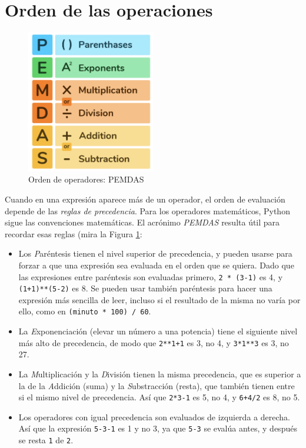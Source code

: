 \hypertarget{orden-de-las-operaciones}{%
\section{Orden de las operaciones}\label{orden-de-las-operaciones}}

 

\begin{figure}[t]
    \centering
    \includegraphics[width=0.5\textwidth]{book/Spanish/02_Valores_Variables_Tipos_etc/images/pemdas.png}
    \caption{Orden de operadores: PEMDAS}
    \label{fig:PEMDAS}
\end{figure}


Cuando en una expresión aparece más de un operador, el orden de
evaluación depende de las \emph{reglas de precedencia}. Para los
operadores matemáticos, Python sigue las convenciones matemáticas. El
acrónimo \emph{PEMDAS} resulta útil para recordar esas reglas (mira la Figura \ref{fig:PEMDAS}:


\begin{itemize}
\item
  Los \emph{P}aréntesis tienen el nivel superior de precedencia, y
  pueden usarse para forzar a que una expresión sea evaluada en el orden
  que se quiera. Dado que las expresiones entre paréntesis son evaluadas
  primero, \texttt{2\ *\ (3-1)} es 4, y \texttt{(1+1)**(5-2)} es 8. Se
  pueden usar también paréntesis para hacer una expresión más sencilla
  de leer, incluso si el resultado de la misma no varía por ello, como
  en \texttt{(minuto\ *  100)\ /\ 60}.
\item
  La \emph{E}xponenciación (elevar un número a una potencia) tiene el
  siguiente nivel más alto de precedencia, de modo que \texttt{2**1+1}
  es 3, no 4, y \texttt{3*1**3} es 3, no 27.
\item
  La \emph{M}ultiplicación y la \emph{D}ivisión tienen la misma
  precedencia, que es superior a la de la \emph{A}ddición (suma) y la \emph{S}ubstracción (resta),
  que también tienen entre si el mismo nivel de precedencia. Así que
  \texttt{2*3-1} es 5, no 4, y \texttt{6+4/2} es 8, no 5.
\item
  Los operadores con igual precedencia son evaluados de izquierda a
  derecha. Así que la expresión \texttt{5-3-1} es 1 y no 3, ya que
  \texttt{5-3} se evalúa antes, y después se resta \texttt{1} de
  \texttt{2}.
\end{itemize}

